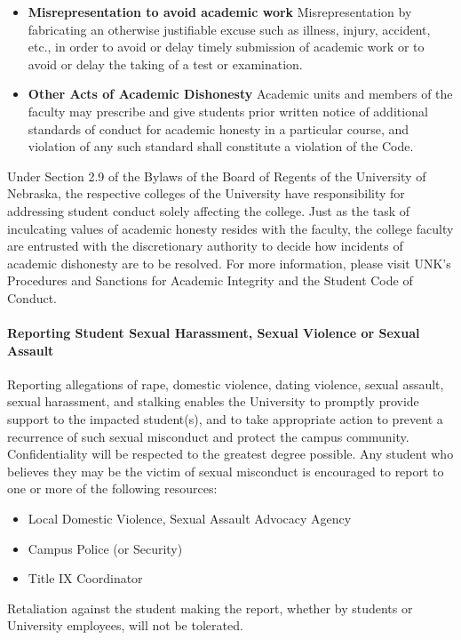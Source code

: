 \documentclass[12pt]{article}
\newcounter{ex}\setcounter{ex}{0}
\begin{document}
\begin{itemize}
    \item \textbf{Misrepresentation to avoid academic work} 
    Misrepresentation by fabricating an otherwise justifiable 
    excuse such as illness, injury, accident, etc., in order 
    to avoid or delay timely submission of academic work or to 
    avoid or delay the taking of a test or examination.
    
    \item \textbf{Other Acts of Academic Dishonesty} Academic units 
    and members of the faculty may prescribe and give students prior 
    written notice of additional standards of conduct for academic 
    honesty in a particular course, and violation of any such 
    standard shall constitute a violation of the Code.

\end{itemize}

Under Section 2.9 of the Bylaws of the Board of Regents of the 
University of Nebraska, the respective colleges of the University 
have responsibility for addressing student conduct solely affecting 
the college. Just as the task of inculcating values of academic 
honesty resides with the faculty, the college faculty 
are entrusted with the discretionary authority to decide 
how incidents of academic dishonesty are to be resolved. 
For more information, please visit UNK's Procedures and 
Sanctions for Academic Integrity and the Student Code of Conduct.


\paragraph{Reporting Student Sexual Harassment, Sexual Violence or Sexual Assault}

Reporting allegations of rape, domestic violence, dating violence, sexual assault, 
sexual harassment, and stalking enables the University to promptly provide support 
to the impacted student(s), and to take appropriate action to prevent a recurrence 
of such sexual misconduct and protect the campus community. Confidentiality will 
be respected to the greatest degree possible. Any student who believes they may 
be the victim of sexual misconduct is encouraged to report to one or more of 
the following resources:

\begin{itemize}
  \item Local Domestic Violence, Sexual Assault Advocacy Agency 

  \item Campus Police (or Security) 

  \item Title IX Coordinator 
\end{itemize}
Retaliation against the student making the report, whether by students or 
University employees, will not be tolerated.
\end{document}
